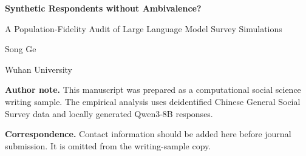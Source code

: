 \documentclass[12pt]{article}
\begin{document}
\thispagestyle{empty}

\begin{center}
\vspace*{1.4in}

{\Large\bfseries Synthetic Respondents without Ambivalence?\par}
\vspace{0.3em}
{\Large A Population-Fidelity Audit of Large Language Model Survey Simulations\par}

\vspace{1.3in}

{\large Song Ge\par}
\vspace{0.2em}
{\large Wuhan University\par}

\vfill

\begin{minipage}{0.78\textwidth}
\textbf{Author note.} This manuscript was prepared as a computational social science
writing sample. The empirical analysis uses deidentified Chinese General Social Survey
data and locally generated Qwen3-8B responses.

\medskip
\textbf{Correspondence.} Contact information should be added here before journal
submission. It is omitted from the writing-sample copy.
\end{minipage}

\vspace{0.8in}
\end{center}
\end{document}

